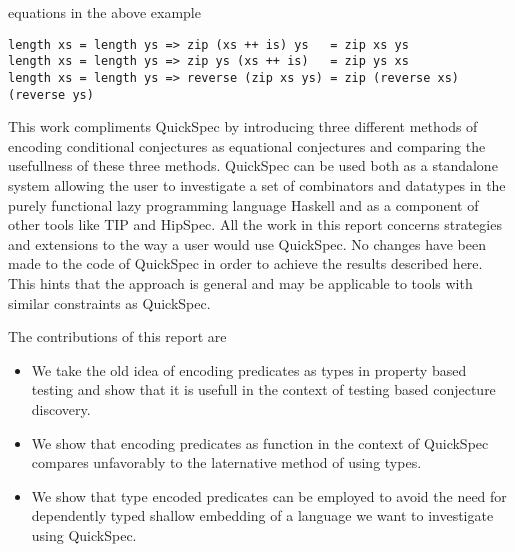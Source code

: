 equations in the above example
\begin{verbatim}
length xs = length ys => zip (xs ++ is) ys   = zip xs ys
length xs = length ys => zip ys (xs ++ is)   = zip ys xs
length xs = length ys => reverse (zip xs ys) = zip (reverse xs) (reverse ys)
\end{verbatim}
This work compliments QuickSpec by introducing three different methods
of encoding conditional conjectures as equational conjectures and comparing
the usefullness of these three methods. QuickSpec can be used both as a standalone
system allowing the user to investigate a set of combinators and datatypes in the
purely functional lazy programming language Haskell and as a component of other tools %
like TIP\cite{Rosen2015} and HipSpec\cite{Claessen2013}. 
All the work in this report concerns strategies and extensions to the way a user would
use QuickSpec. No changes have been made to the code of QuickSpec in order to
achieve the results described here. This hints that the approach is general
and may be applicable to tools with similar constraints as QuickSpec.

The contributions of this report are
\begin{itemize}
    \item We take the old idea of encoding predicates as types
        in property based testing and show that it is usefull in
        the context of testing based conjecture discovery.

    \item We show that encoding predicates as function in the context
        of QuickSpec compares unfavorably to the laternative method
        of using types.

    \item We show that type encoded predicates can be employed to avoid 
        the need for dependently typed shallow embedding of a language
        we want to investigate using QuickSpec.
\end{itemize}

